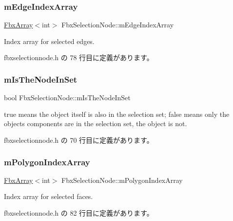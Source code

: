 \subsubsection{\texorpdfstring{m\+Edge\+Index\+Array}{mEdgeIndexArray}}
{\footnotesize\ttfamily \hyperlink{class_fbx_array}{Fbx\+Array}$<$int$>$ Fbx\+Selection\+Node\+::m\+Edge\+Index\+Array}

Index array for selected edges. 

 fbxselectionnode.\+h の 78 行目に定義があります。

\mbox{\label{class_fbx_selection_node_abe086e3632a8526188a5c706f3edff0d}} 
\subsubsection{\texorpdfstring{m\+Is\+The\+Node\+In\+Set}{mIsTheNodeInSet}}
{\footnotesize\ttfamily bool Fbx\+Selection\+Node\+::m\+Is\+The\+Node\+In\+Set}

{\ttfamily true} means the object itself is also in the selection set; {\ttfamily false} means only the object\textquotesingle{}s components are in the selection set, the object is not. 

 fbxselectionnode.\+h の 70 行目に定義があります。

\mbox{\label{class_fbx_selection_node_a542b95a44b33e6b88af56e202612583f}} 
\subsubsection{\texorpdfstring{m\+Polygon\+Index\+Array}{mPolygonIndexArray}}
{\footnotesize\ttfamily \hyperlink{class_fbx_array}{Fbx\+Array}$<$int$>$ Fbx\+Selection\+Node\+::m\+Polygon\+Index\+Array}

Index array for selected faces. 

 fbxselectionnode.\+h の 82 行目に定義があります。

\mbox{\label{class_fbx_selection_node_abb893b8d98420522d6bc2790780b54a3}} 
